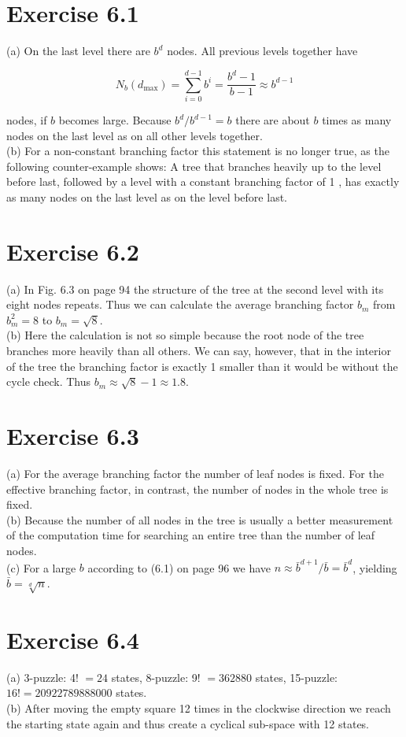 \documentclass[10pt]{article}
\begin{document}
\section*{Exercise 6.1}
(a) On the last level there are $b^{d}$ nodes. All previous levels together have

$$
N_{b}\left(d_{\max }\right)=\sum_{i=0}^{d-1} b^{i}=\frac{b^{d}-1}{b-1} \approx b^{d-1}
$$

nodes, if $b$ becomes large. Because $b^{d} / b^{d-1}=b$ there are about $b$ times as many nodes on the last level as on all other levels together.\\
(b) For a non-constant branching factor this statement is no longer true, as the following counter-example shows: A tree that branches heavily up to the level before last, followed by a level with a constant branching factor of 1 , has exactly as many nodes on the last level as on the level before last.

\section*{Exercise 6.2}
(a) In Fig. 6.3 on page 94 the structure of the tree at the second level with its eight nodes repeats. Thus we can calculate the average branching factor $b_{m}$ from $b_{m}^{2}=8$ to $b_{m}=\sqrt{8}$.\\
(b) Here the calculation is not so simple because the root node of the tree branches more heavily than all others. We can say, however, that in the interior of the tree the branching factor is exactly 1 smaller than it would be without the cycle check. Thus $b_{m} \approx \sqrt{8}-1 \approx 1.8$.

\section*{Exercise 6.3}
(a) For the average branching factor the number of leaf nodes is fixed. For the effective branching factor, in contrast, the number of nodes in the whole tree is fixed.\\
(b) Because the number of all nodes in the tree is usually a better measurement of the computation time for searching an entire tree than the number of leaf nodes.\\
(c) For a large $b$ according to (6.1) on page 96 we have $n \approx \bar{b}^{d+1} / \bar{b}=\bar{b}^{d}$, yielding $\bar{b}=\sqrt[d]{n}$.

\section*{Exercise 6.4}
(a) 3-puzzle: 4! $=24$ states, 8-puzzle: 9! $=362880$ states, 15-puzzle: $16!=20922789888000$ states.\\
(b) After moving the empty square 12 times in the clockwise direction we reach the starting state again and thus create a cyclical sub-space with 12 states.
\end{document}
